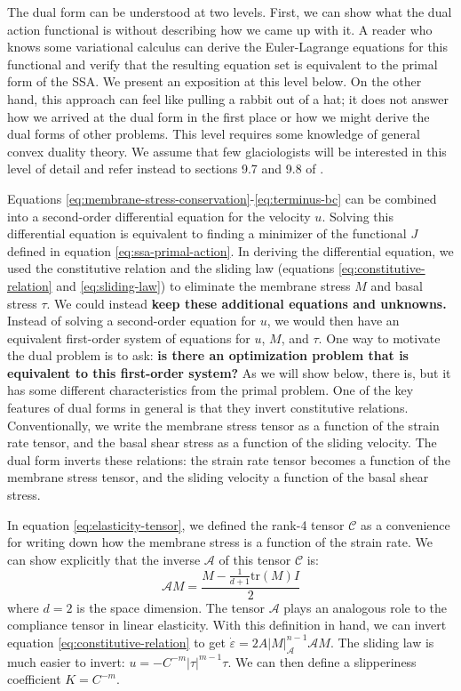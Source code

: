\documentclass[twocolumn,letterpaper]{igs}
\begin{document}
The dual form can be understood at two levels.
First, we can show what the dual action functional is without describing how we came up with it.
A reader who knows some variational calculus can derive the Euler-Lagrange equations for this functional and verify that the resulting equation set is equivalent to the primal form of the SSA.
We present an exposition at this level below.
On the other hand, this approach can feel like pulling a rabbit out of a hat; it does not answer how we arrived at the dual form in the first place or how we might derive the dual forms of other problems.
This level requires some knowledge of general convex duality theory.
We assume that few glaciologists will be interested in this level of detail and refer instead to sections 9.7 and 9.8 of \citet{attouch2014variational}.

Equations \eqref{eq:membrane-stress-conservation}-\eqref{eq:terminus-bc} can be combined into a second-order differential equation for the velocity $u$.
Solving this differential equation is equivalent to finding a minimizer of the functional $J$ defined in equation \eqref{eq:ssa-primal-action}.
In deriving the differential equation, we used the constitutive relation and the sliding law (equations \eqref{eq:constitutive-relation} and \eqref{eq:sliding-law}) to eliminate the membrane stress $M$ and basal stress $\tau$.
We could instead \textbf{keep these additional equations and unknowns.}
Instead of solving a second-order equation for $u$, we would then have an equivalent first-order system of equations for $u$, $M$, and $\tau$.
One way to motivate the dual problem is to ask: \textbf{is there an optimization problem that is equivalent to this first-order system?}
As we will show below, there is, but it has some different characteristics from the primal problem.
One of the key features of dual forms in general is that they invert constitutive relations.
Conventionally, we write the membrane stress tensor as a function of the strain rate tensor, and the basal shear stress as a function of the sliding velocity.
The dual form inverts these relations: the strain rate tensor becomes a function of the membrane stress tensor, and the sliding velocity a function of the basal shear stress.

In equation \eqref{eq:elasticity-tensor}, we defined the rank-4 tensor $\mathscr{C}$ as a convenience for writing down how the membrane stress is a function of the strain rate.
We can show explicitly that the inverse $\mathscr{A}$ of this tensor $\mathscr{C}$ is:
\begin{equation}
    \mathscr{A}M = \frac{M - \frac{1}{d + 1}\text{tr}(M)I}{2}
\end{equation}
where $d = 2$ is the space dimension.
The tensor $\mathscr{A}$ plays an analogous role to the compliance tensor in linear elasticity.
With this definition in hand, we can invert equation \eqref{eq:constitutive-relation} to get $\dot\varepsilon = 2A|M|_{\mathscr{A}}^{n - 1}\mathscr{A}M$.
The sliding law is much easier to invert: $u = -C^{-m}|\tau|^{m - 1}\tau$.
We can then define a slipperiness coefficient $K = C^{-m}$.
\end{document}
